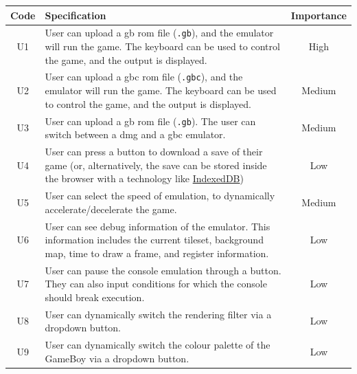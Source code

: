 \documentclass[11pt]{report}
\begin{document}
\begin{xltabular}{\textwidth}{|c|X|c|}
    \hline
    \textbf{Code} & \textbf{Specification} & \textbf{Importance}\\
    \hline\hline
    \endhead

    U1 & User can upload a \gls{gb} \gls{rom} file (\texttt{.gb}), and the emulator will run the game. The keyboard can be used to control the game, and the output is displayed. & High \\ \hline
    U2 & User can upload a \gls{gbc} \gls{rom} file (\texttt{.gbc}), and the emulator will run the game. The keyboard can be used to control the game, and the output is displayed. & Medium \\ \hline
    U3 & User can upload a \gls{gb} \gls{rom} file (\texttt{.gb}). The user can switch between a \gls{dmg} and a \gls{gbc} emulator. & Medium \\ \hline
    U4 & User can press a button to download a save of their game (or, alternatively, the save can be stored inside the browser with a technology like \href{https://developer.mozilla.org/en-US/docs/Web/API/IndexedDB_API}{IndexedDB}) & Low \\ \hline
    U5 & User can select the speed of emulation, to dynamically accelerate/decelerate the game. & Medium \\ \hline
    U6 & User can see debug information of the emulator. This information includes the current tileset, background map, time to draw a frame, and register information. & Low \\ \hline
    U7 & User can pause the console emulation through a button. They can also input conditions for which the console should break execution. & Low \\ \hline
    U8 & User can dynamically switch the rendering filter via a dropdown button. & Low \\ \hline
    U9 & User can dynamically switch the colour palette of the GameBoy via a dropdown button. & Low \\ \hline


\end{xltabular}
\end{document}
